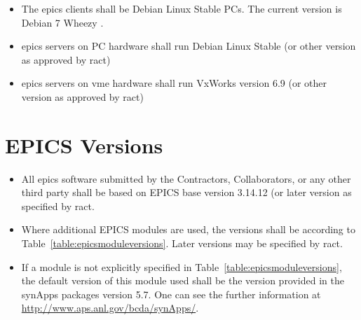 \documentclass[11pt
  , a4paper
  , article
  , oneside
]{memoir}
\begin{document}
\begin{itemize}
  \item The \Gls{epics} clients shall be Debian Linux Stable PCs. The current version is Debian 7 Wheezy \cite{DEBIAN}. 
  \item \Gls{epics} servers on PC hardware shall run Debian Linux Stable (or other version as approved by \Gls{ract})
  \item \Gls{epics} servers on \Gls{vme} hardware shall run VxWorks version 6.9 (or other version as approved by \Gls{ract})
\end{itemize}


\chapter{EPICS Versions}
\begin{itemize}
  \item All \Gls{epics} software submitted by the Contractors, Collaborators, or any other third party shall be based on EPICS base version 3.14.12 (or later version as specified by \Gls{ract}.
  \item Where additional EPICS modules are used, the versions shall be according to Table~\ref{table:epicsmoduleversions}. Later versions may be specified by \Gls{ract}.
  \item If a module is not explicitly specified in Table~\ref{table:epicsmoduleversions}, the default version of this module used shall be the version provided in the synApps packages version 5.7. One can see the further information at \url{http://www.aps.anl.gov/bcda/synApps/}.
\end{itemize}
\end{document}
